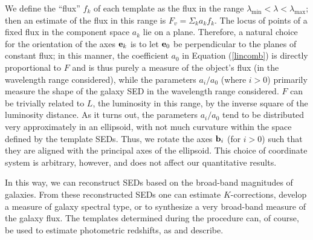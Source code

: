 \documentclass[10pt,preprint]{aastex}
\newcommand{\vv}[1]{{\bf #1}}
\begin{document}

We define the ``flux'' $f_k$ of each template as the flux in the range
$\lambda_{\mathrm{min}}<\lambda<\lambda_{\mathrm{max}}$; then an
estimate of the flux in this range is $F_{{v}}=\Sigma_k a_k f_k$. The
locus of points of a fixed flux in the component space $a_k$ lie on a
plane. Therefore, a natural choice for the orientation of the axes
$\vv{e}_k$ is to let $\vv{e}_0$ be perpendicular to the planes of
constant flux; in this manner, the coefficient $a_0$ in Equation
(\ref{lincomb}) is directly proportional to $F$ and is thus purely a
measure of the object's flux (in the wavelength range considered),
while the parameters $a_i/a_0$ (where $i>0$) primarily measure the
shape of the galaxy SED in the wavelength range considered. $F$ can be
trivially related to $L$, the luminosity in this range, by the inverse
square of the luminosity distance.  As it turns out, the parameters
$a_i/a_0$ tend to be distributed very approximately in an ellipsoid,
with not much curvature within the space defined by the template
SEDs. Thus, we rotate the axes $\vv{b}_i$ (for $i>0$) such that they
are aligned with the principal axes of the ellipsoid. This choice of
coordinate system is arbitrary, however, and does not affect our
quantitative results.

In this way, we can reconstruct SEDs based on the broad-band
magnitudes of galaxies. From these reconstructed SEDs one can estimate
$K$-corrections, develop a measure of galaxy spectral type, or to
synthesize a very broad-band measure of the galaxy flux.  The
templates determined during the procedure can, of course, be used to
estimate photometric redshifts, as \citet{csabai00a} and
\citet{budavari00a} describe.
\end{document}
